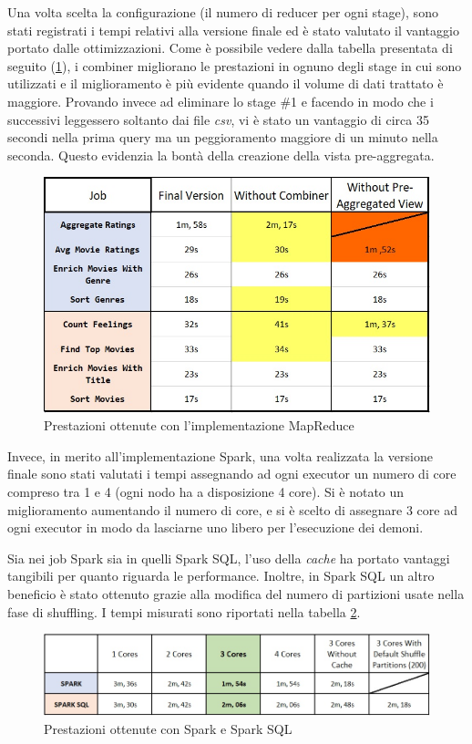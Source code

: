 \documentclass[10pt]{article}
\begin{document}
Una volta scelta la configurazione (il numero di reducer per ogni stage), sono stati registrati i tempi relativi alla versione finale ed è stato valutato il vantaggio portato dalle ottimizzazioni. Come è possibile vedere dalla tabella presentata di seguito (\ref{PerformanceMapReduce2}), i combiner migliorano le prestazioni in ognuno degli stage in cui sono utilizzati e il miglioramento è più evidente quando il volume di dati trattato è maggiore. Provando invece ad eliminare lo stage \#1 e facendo in modo che i successivi leggessero soltanto dai file \textit{csv}, vi è stato un vantaggio di circa 35 secondi nella prima query ma un peggioramento maggiore di un minuto nella seconda. Questo evidenzia la bontà della creazione della vista pre-aggregata.

\begin{figure}[th]
	\centering
	\includegraphics[scale=0.66]{images/PerformanceMapReduce2.jpg}
	\caption{Prestazioni ottenute con l'implementazione MapReduce}
	\label{PerformanceMapReduce2}
\end{figure}

Invece, in merito all'implementazione Spark, una volta realizzata la versione finale sono stati valutati i tempi assegnando ad ogni executor un numero di core compreso tra 1 e 4 (ogni nodo ha a disposizione 4 core). Si è notato un miglioramento aumentando il numero di core, e si è scelto di assegnare 3 core ad ogni executor in modo da lasciarne uno libero per l'esecuzione dei demoni.

Sia nei job Spark sia in quelli Spark SQL, l'uso della \textit{cache} ha portato vantaggi tangibili per quanto riguarda le performance. Inoltre, in Spark SQL un altro beneficio è stato ottenuto grazie alla modifica del numero di partizioni usate nella fase di shuffling. I tempi misurati sono riportati nella tabella \ref{PerformanceSpark}.

\begin{figure}[th]
	\centering
	\includegraphics[scale=0.68]{images/PerformanceSpark.jpg}
	\caption{Prestazioni ottenute con Spark e Spark SQL}
	\label{PerformanceSpark}
\end{figure}
\end{document}
